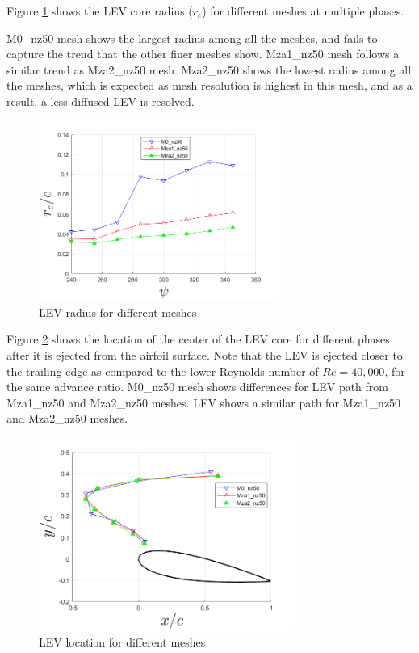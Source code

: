 Figure \ref{fig:zonal_LEV_radius_Re200k} shows the LEV core radius ($r_c$) for different meshes at multiple phases.

M0\_nz50 mesh shows the largest radius among all the meshes, and fails to capture the trend that the other finer meshes show.
Mza1\_nz50 mesh follows a similar trend as Mza2\_nz50 mesh.
Mza2\_nz50 shows the lowest radius among all the meshes, which is expected as mesh resolution is highest in this mesh, and as a result, a less diffused LEV is resolved.

\begin{figure}[H]
	\centering
	\includegraphics[width=0.7\textwidth]{figures/zonal_adapt_results/LEV_Re200k/LEV_radius_vp}
	\caption{ LEV radius for different meshes}
	\label{fig:zonal_LEV_radius_Re200k}
\end{figure}

Figure \ref{fig:zonal_LEV_location_Re200k} shows the location of the center of the LEV core for different phases after it is ejected from the airfoil surface.
Note that the LEV is ejected closer to the trailing edge as compared to the lower Reynolds number of $Re=40,000$, for the same advance ratio.
M0\_nz50 mesh shows differences for LEV path from Mza1\_nz50 and Mza2\_nz50 meshes. LEV shows a similar path for Mza1\_nz50 and Mza2\_nz50 meshes.

\begin{figure}[H]
	\centering
	\includegraphics[width=0.75\textwidth]{figures/zonal_adapt_results/LEV_Re200k/LEV_location_Re200k}
	\caption{ LEV location for different meshes}
	\label{fig:zonal_LEV_location_Re200k}
\end{figure}

